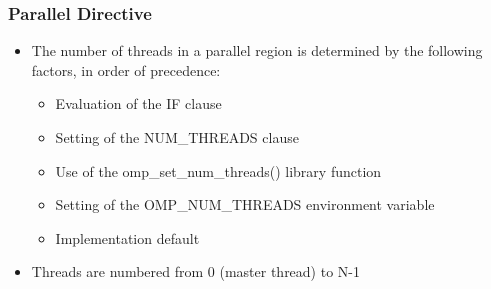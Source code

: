 \documentclass[10pt,t]{beamer}
\begin{document}
\begin{frame}
  \frametitle{Parallel Directive}
  \begin{itemize}
  \item The number of threads in a parallel region is determined by the following factors, in order of precedence:
    \begin{itemize}
    \item Evaluation of the IF clause
    \item Setting of the NUM\_THREADS clause
    \item Use of the omp\_set\_num\_threads() library function
    \item Setting of the OMP\_NUM\_THREADS environment variable
    \item Implementation default
    \end{itemize}
  \item Threads are numbered from 0 (master thread) to N-1
  \end{itemize}
\end{frame}
\end{document}

